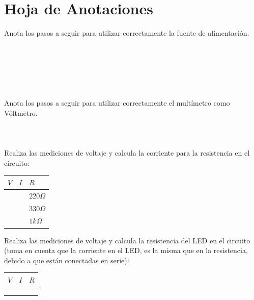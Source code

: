 
\clearpage
\section{Hoja de Anotaciones}
	Anota los pasos a seguir para utilizar correctamente la fuente de alimentación. \\ \\ \\ \\ \\ \\ \\

	Anota los pasos a seguir para utilizar correctamente el multímetro como Vóltmetro. \\ \\ \\ \\

	Realiza las mediciones de voltaje y calcula la corriente para la resistencia en el circuito:

	\begin{center}
		\begin{tabular}{|p{1.5cm}|p{1.5cm}|p{1.5cm}|}
			\hline
			$V$ & $I$ & $R$          \\
			\hline
			    &     & $220 \Omega$ \\
			\hline
			    &     & $330 \Omega$ \\
			\hline
			    &     & $1 k \Omega$ \\
			\hline
		\end{tabular}
	\end{center}

	Realiza las mediciones de voltaje y calcula la resistencia del LED en el circuito (toma en cuenta que la corriente en el LED, es la misma que en la resistencia, debido a que están conectadas en serie):

	\begin{center}
		\begin{tabular}{|p{1.5cm}|p{1.5cm}|p{1.5cm}|}
			\hline
			$V$ & $I$ & $R$ \\
			\hline
			    &     &     \\
			\hline
			    &     &     \\
			\hline
			    &     &     \\
			\hline
		\end{tabular}
	\end{center}

